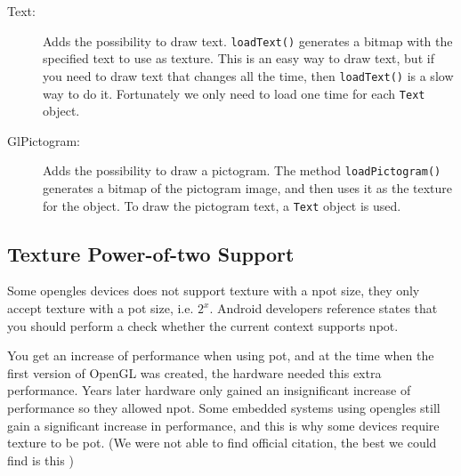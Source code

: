 \begin{description}
\item[Text:] Adds the possibility to draw text. \lstinline|loadText()| generates a bitmap with the specified text to use as texture. This is an easy way to draw text, but if you need to draw text that changes all the time, then \lstinline|loadText()| is a slow way to do it. Fortunately we only need to load one time for each \lstinline|Text| object.

\item[GlPictogram:] Adds the possibility to draw a pictogram. The method \linebreak \lstinline|loadPictogram()| generates a bitmap of the pictogram image, and then uses it as the texture for the object. To draw the pictogram text, a \lstinline|Text| object is used.
\end{description}

\subsection{Texture Power-of-two Support}\label{sec:potsupport}
Some \ac{opengles} devices does not support texture with a \acf{npot} size, they only accept texture with a \ac{pot} size, i.e. $2^x$. Android developers reference states that you should perform a check whether the current context supports \ac{npot}. \citep{glutils}

You get an increase of performance when using \ac{pot}, and at the time when the first version of OpenGL was created, the hardware needed this extra performance. Years later hardware only gained an insignificant increase of performance so they allowed \ac{npot}. Some embedded systems using \ac{opengles} still gain a significant increase in performance, and this is why some devices require texture to be \ac{pot}. (We were not able to find official citation, the best we could find is this \citep{potperformance})

